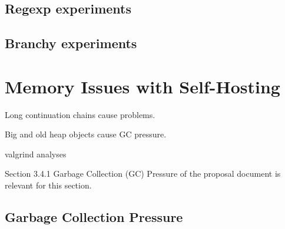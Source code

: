 		\subsection{Regexp experiments}
		\subsection{Branchy experiments}
			\label{section:branchy}

	\section{Memory Issues with Self-Hosting}
		\label{section:memory}

		\begin{mainpoint}
			Long continuation chains cause problems.

			Big and old heap objects cause GC pressure.
		\end{mainpoint}

		valgrind analyses

		\begin{todo}[Import]
			Section 3.4.1 Garbage Collection (GC) Pressure of the proposal document is relevant for this section.
		\end{todo}

		\subsection{Garbage Collection Pressure}

